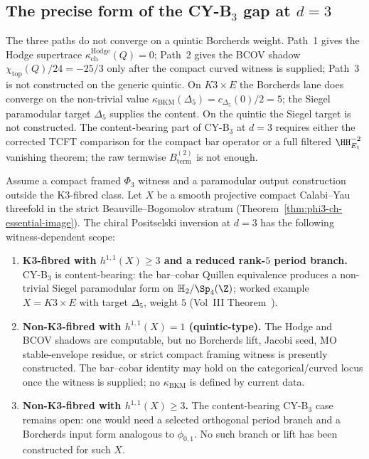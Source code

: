 \subsection{The precise form of the CY-B$_3$ gap at $d = 3$}
\label{subsec:quintic-cy-b3-gap}

The three paths do not converge on a quintic Borcherds weight.
Path~1 gives the Hodge supertrace
$\kappa_{\mathrm{ch}}^{\mathrm{Hodge}}(Q)=0$; Path~2 gives the BCOV
shadow $\chi_{\mathrm{top}}(Q)/24=-25/3$ only after the compact curved
witness is supplied; Path~3 is not constructed on the generic quintic.
On $K3 \times E$ the Borcherds lane does converge on the non-trivial value
$\kappa_{\mathrm{BKM}}(\Delta_5) = c_{\Delta_5}(0)/2
= 5$; the Siegel paramodular target $\Delta_5$ supplies the
content. On the quintic the Siegel target is not constructed. The
content-bearing part of CY-B$_3$ at $d = 3$ requires either the
corrected TCFT comparison for the compact bar operator or a full
filtered $\HH^{-2}_{E_1}$ vanishing theorem; the raw termwise
$B^{(2)}_{\mathrm{term}}$ is not enough.

\begin{theorem}
\label{thm:cy-b3-scope-quintic-chapter}
Assume a compact framed $\Phi_3$ witness and a paramodular output
construction outside the K3-fibred class.
Let $X$ be a smooth projective compact Calabi--Yau threefold in
the strict Beauville--Bogomolov stratum (Theorem~\ref{thm:phi3-ch-essential-image}).
The chiral Positselski inversion at $d = 3$ has the following
witness-dependent scope:
\begin{enumerate}[label=\textup{(\Roman*)}]
\item \textbf{K3-fibred with $h^{1, 1}(X) \geq 3$ and a reduced
rank-\(5\) period branch.} CY-B$_3$ is content-bearing: the bar--cobar
Quillen equivalence produces a non-trivial Siegel paramodular
form on $\mathbb{H}_2 / \Sp_4(\Z)$; worked example $X = K3 \times E$
with target $\Delta_5$, weight $5$ (Vol~III
\cite{VolI}
Theorem~\cite{VolI}).
\item \textbf{Non-K3-fibred with $h^{1, 1}(X) = 1$ (quintic-type).}
The Hodge and BCOV shadows are computable, but no Borcherds lift,
Jacobi seed, MO stable-envelope residue, or strict compact framing
witness is presently constructed. The bar--cobar identity may hold on
the categorical/curved locus once the witness is supplied; no
$\kappa_{\mathrm{BKM}}$ is defined by current data.
\item \textbf{Non-K3-fibred with $h^{1, 1}(X) \geq 3$.} The
content-bearing CY-B$_3$ case remains open: one would need a selected
orthogonal period branch and a Borcherds input form analogous to
\(\phi_{0,1}\). No such branch or lift has been constructed for such
\(X\).
\end{enumerate}
\end{theorem}

